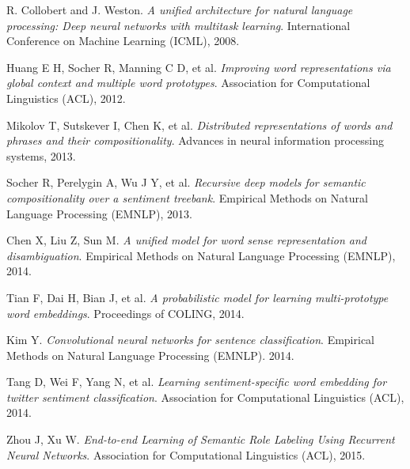 \documentclass{scrartcl}
\begin{document}
\begin{thebibliography}{99}

R. Collobert and J. Weston. 
{\sl A unified architecture for natural language processing: Deep neural networks with multitask learning}. 
International Conference on Machine Learning (ICML), 2008. 

Huang E H, Socher R, Manning C D, et al. 
{\sl Improving word representations via global context and multiple word prototypes}. 
Association for Computational Linguistics (ACL), 2012.

Mikolov T, Sutskever I, Chen K, et al. 
{\sl Distributed representations of words and phrases and their compositionality}. 
Advances in neural information processing systems, 2013.

Socher R, Perelygin A, Wu J Y, et al. 
{\sl Recursive deep models for semantic compositionality over a sentiment treebank}. 
Empirical Methods on Natural Language Processing (EMNLP), 2013.

Chen X, Liu Z, Sun M. 
{\sl A unified model for word sense representation and disambiguation}. 
Empirical Methods on Natural Language Processing (EMNLP), 2014.

Tian F, Dai H, Bian J, et al. 
{\sl A probabilistic model for learning multi-prototype word embeddings}.
Proceedings of COLING, 2014.

Kim Y. 
{\sl Convolutional neural networks for sentence classification}. 
Empirical Methods on Natural Language Processing (EMNLP). 2014.

Tang D, Wei F, Yang N, et al. 
{\sl Learning sentiment-specific word embedding for twitter sentiment classification}. 
Association for Computational Linguistics (ACL), 2014.

Zhou J, Xu W. 
{\sl End-to-end Learning of Semantic Role Labeling Using Recurrent Neural Networks}. 
Association for Computational Linguistics (ACL), 2015.

\end{thebibliography}
\end{document}
